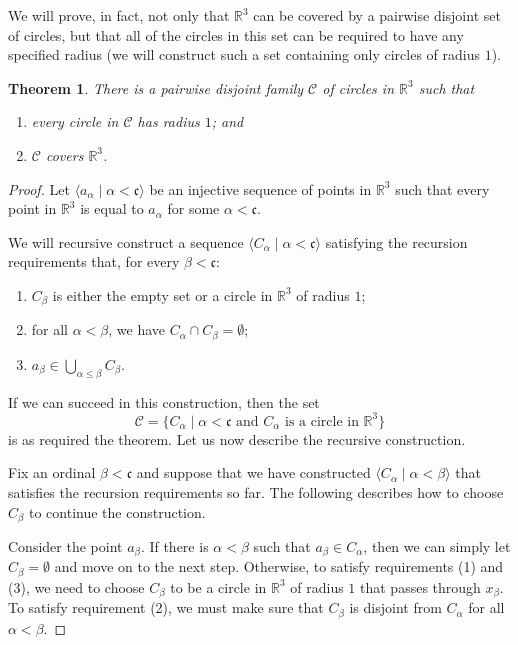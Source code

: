 \documentclass[a4paper]{memoir}
\newtheorem{theorem}{Theorem}[section]
\theoremstyle{definition}
\newcommand{\bb}{\mathbb}
\newcommand{\mc}{\mathcal}
\begin{document}
We will prove, in fact, not only that $\bb{R}^3$ can be covered by a pairwise disjoint set of circles, 
but that all of the circles in this set can be required to have any specified radius (we will 
construct such a set containing only circles of radius $1$). 

\begin{theorem}
  There is a pairwise disjoint family $\mc{C}$ of circles in $\bb{R}^3$ such that
  \begin{enumerate}
    \item every circle in $\mc{C}$ has radius $1$; and
    \item $\mc{C}$ covers $\bb{R}^3$.
  \end{enumerate}
\end{theorem}

\begin{proof}
  Let $\langle a_\alpha \mid \alpha < \mathfrak{c} \rangle$ be an injective sequence of points 
  in $\bb{R}^3$ such that every point in $\bb{R}^3$ is equal to $a_\alpha$ for some $\alpha < \mathfrak{c}$.
  
  We will recursive construct a sequence $\langle C_\alpha \mid \alpha < \mathfrak{c} \rangle$ satisfying 
  the recursion requirements that, for every $\beta < \mathfrak{c}$:
  \begin{enumerate}
    \item $C_\beta$ is either the empty set or a circle in $\bb{R}^3$ of radius $1$;
    \item for all $\alpha < \beta$, we have $C_\alpha \cap C_\beta = \emptyset$;
    \item $a_\beta \in \bigcup_{\alpha \leq \beta} C_\beta$.
  \end{enumerate}
  If we can succeed in this construction, then the set
  \[
    \mc{C} = \{C_\alpha \mid \alpha < \mathfrak{c} \text{ and } C_\alpha \text{ is a circle in } \bb{R}^3\}
  \]
  is as required the theorem. Let us now describe the recursive construction.
  
  Fix an ordinal $\beta < \mathfrak{c}$ and suppose that we have constructed 
  $\langle C_\alpha \mid \alpha < \beta \rangle$ that satisfies the recursion requirements so far. 
  The following describes how to choose $C_\beta$ to continue the construction.
  
  Consider the point $a_\beta$. If there is $\alpha < \beta$ such that $a_\beta \in C_\alpha$, 
  then we can simply let $C_\beta = \emptyset$ and move on to the next step. Otherwise, to satisfy 
  requirements (1) and (3), we need to choose $C_\beta$ to be a circle in $\bb{R}^3$ of radius $1$ 
  that passes through $x_\beta$. To satisfy requirement (2), we must make sure that $C_\beta$ 
  is disjoint from $C_\alpha$ for all $\alpha < \beta$.
  

\end{proof}
\end{document}

